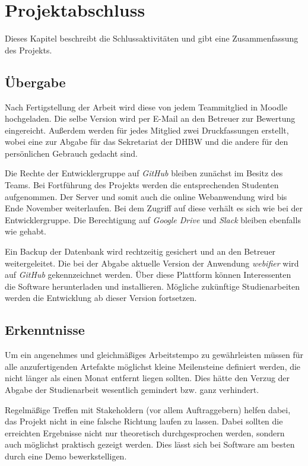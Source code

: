 \documentclass[
	pdftex,
	fontsize=12pt,          %
	DIV10,                  %
	ngerman,                %
	paper=a4,               %
	twoside=false,          %
	titlepage,              %
	parskip=half,           %
	headings=normal,        %
	listof=nochaptergap,  %
	bibliography=totoc, %
	index=totoc,            %
	captions=tableheading,  %
	final                 %
]{scrreprt}
\begin{document}
\newpage
\chapter{Projektabschluss}
Dieses Kapitel beschreibt die Schlussaktivitäten und gibt eine Zusammenfassung des Projekts.

\section{Übergabe}
Nach Fertigstellung der Arbeit wird diese von jedem Teammitglied in Moodle hochgeladen. Die selbe Version wird per E-Mail an den Betreuer zur Bewertung eingereicht. Außerdem werden für jedes Mitglied zwei Druckfassungen erstellt, wobei eine zur Abgabe für das Sekretariat der DHBW und die andere für den persönlichen Gebrauch gedacht sind.

Die Rechte der Entwicklergruppe auf \textit{GitHub} bleiben zunächst im Besitz des Teams. Bei Fortführung des Projekts werden die entsprechenden Studenten aufgenommen. Der Server und somit auch die online Webanwendung wird bis Ende November weiterlaufen. Bei dem Zugriff auf diese verhält es sich wie bei der Entwicklergruppe. Die Berechtigung auf \textit{Google Drive} und \textit{Slack} bleiben ebenfalls wie gehabt.

Ein Backup der Datenbank wird rechtzeitig gesichert und an den Betreuer weitergeleitet. Die bei der Abgabe aktuelle Version der Anwendung \textit{webifier} wird auf \textit{GitHub} gekennzeichnet werden. Über diese Plattform können Interessenten die Software herunterladen und installieren. Mögliche zukünftige Studienarbeiten werden die Entwicklung ab dieser Version fortsetzen.


\section{Erkenntnisse}
Um ein angenehmes und gleichmäßiges Arbeitstempo zu gewährleisten müssen für alle anzufertigenden Artefakte möglichst kleine Meilensteine definiert werden, die nicht länger als einen Monat entfernt liegen sollten. Dies hätte den Verzug der Abgabe der Studienarbeit wesentlich gemindert bzw. ganz verhindert.

Regelmäßige Treffen mit Stakeholdern (vor allem Auftraggebern) helfen dabei, das Projekt nicht in eine falsche Richtung laufen zu lassen. Dabei sollten die erreichten Ergebnisse nicht nur theoretisch durchgesprochen werden, sondern auch möglichst praktisch gezeigt werden. Dies lässt sich bei Software am besten durch eine Demo bewerkstelligen.
\end{document}
